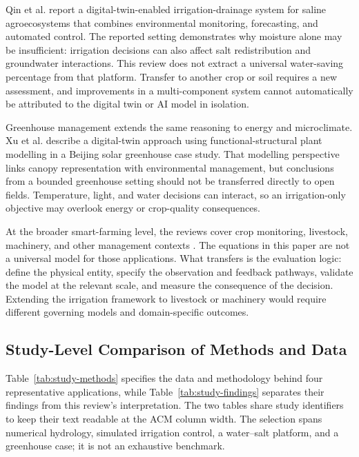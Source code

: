 \documentclass[acmsmall,screen,nonacm]{acmart}
\begin{document}
Qin et al. \cite{R19} report a digital-twin-enabled irrigation-drainage system for saline agroecosystems that combines environmental monitoring, forecasting, and automated control. The reported setting demonstrates why moisture alone may be insufficient: irrigation decisions can also affect salt redistribution and groundwater interactions. This review does not extract a universal water-saving percentage from that platform. Transfer to another crop or soil requires a new assessment, and improvements in a multi-component system cannot automatically be attributed to the digital twin or AI model in isolation.

Greenhouse management extends the same reasoning to energy and microclimate. Xu et al. \cite{R20} describe a digital-twin approach using functional-structural plant modelling in a Beijing solar greenhouse case study. That modelling perspective links canopy representation with environmental management, but conclusions from a bounded greenhouse setting should not be transferred directly to open fields. Temperature, light, and water decisions can interact, so an irrigation-only objective may overlook energy or crop-quality consequences.

At the broader smart-farming level, the reviews cover crop monitoring, livestock, machinery, and other management contexts \cite{R02,R03}. The equations in this paper are not a universal model for those applications. What transfers is the evaluation logic: define the physical entity, specify the observation and feedback pathways, validate the model at the relevant scale, and measure the consequence of the decision. Extending the irrigation framework to livestock or machinery would require different governing models and domain-specific outcomes.


\subsection{Study-Level Comparison of Methods and Data}
\label{sec:study-comparison}
Table~\ref{tab:study-methods} specifies the data and methodology behind four representative applications, while Table~\ref{tab:study-findings} separates their findings from this review's interpretation. The two tables share study identifiers to keep their text readable at the ACM column width. The selection spans numerical hydrology, simulated irrigation control, a water--salt platform, and a greenhouse case; it is not an exhaustive benchmark.
\end{document}

